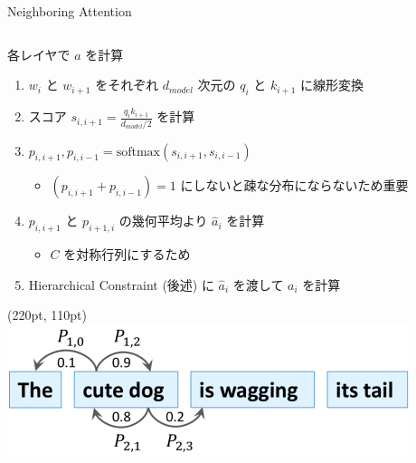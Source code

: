 \documentclass[unicode, 12pt, aspectratio=43]{beamer}
\begin{document}
\begin{frame}[label={sec:org1e1a03b}]{Neighboring Attention}
\begin{columns}
\begin{column}{1.1\columnwidth}
\begin{block}{各レイヤで \(a\) を計算}
\begin{enumerate}
\item \(w_i\) と \(w_{i+1}\) をそれぞれ \(d_{model}\) 次元の \(q_i\) と \(k_{i+1}\) に線形変換
\item スコア \(s_{i, i+1} = \frac{q_i k_{i+1}}{d_{model} / 2}\) を計算 \vspace{0.3cm}
\item \(p_{i, i+1}, p_{i, i-1} = \mathrm{softmax}(s_{i, i+1}, s_{i, i-1})\)
\begin{itemize}
\item \footnotesize \((p_{i, i+1} + p_{i, i-1}) = 1\) にしないと疎な分布にならないため重要 \normalsize
\end{itemize}
\item \(p_{i, i+1}\) と \(p_{i+1, i}\) の幾何平均より \(\hat{a}_i\) を計算
\begin{itemize}
\item \(C\) を対称行列にするため
\end{itemize}
\item Hierarchical Constraint (後述) に \(\hat{a}_i\) を渡して \(a_i\) を計算
\end{enumerate}

\begin{textblock*}{0.4\linewidth}(220pt, 110pt)
    \centering
    \includegraphics[width=\linewidth]{./figure/Figure2.pdf}
\end{textblock*}
\end{block}
\end{column}
\end{columns}
\end{frame}
\end{document}
